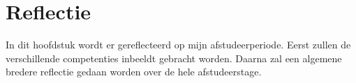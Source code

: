 \chapter{Reflectie}
In dit hoofdstuk wordt er gereflecteerd op mijn afstudeerperiode.
Eerst zullen de verschillende competenties inbeeldt gebracht worden.
Daarna zal een algemene bredere reflectie gedaan worden over de hele afstudeerstage.


\newpage


